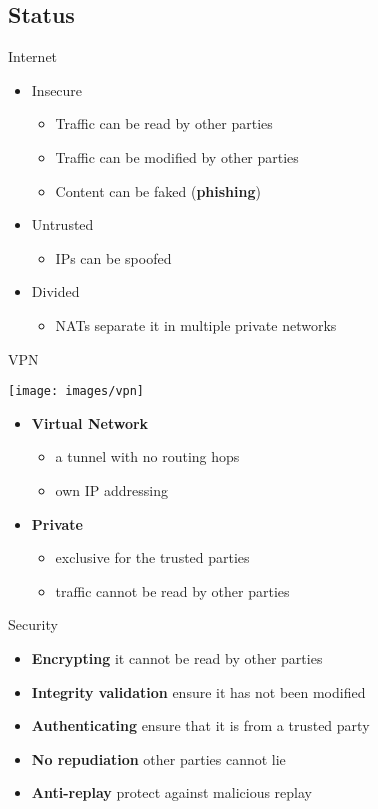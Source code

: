 \documentclass{beamer}
\begin{document}
\subsection*{Status}
\begin{frame}{Internet}
	\begin{itemize}
	\item Insecure
		\begin{itemize}
		\item Traffic can be read by other parties
		\item Traffic can be modified by other parties
		\item Content can be faked (\textbf{phishing})
		\end{itemize}
	\item Untrusted
		\begin{itemize}
		\item IPs can be spoofed
		\end{itemize}
	\item Divided
		\begin{itemize}
		\item NATs separate it in multiple private networks
		\end{itemize}
	\end{itemize}
\end{frame}
\begin{frame}{VPN}
	\begin{center}
	\texttt{[image: images/vpn]}
	\end{center}
	\begin{itemize}
	\item \textbf{Virtual Network}
		\begin{itemize}
		\item a tunnel with no routing hops
		\item own IP addressing
		\end{itemize}
	\item \textbf{Private}
		\begin{itemize}
		\item exclusive for the trusted parties
		\item traffic cannot be read by other parties
		\end{itemize}
	\end{itemize}
\end{frame}
\begin{frame}{Security}
	\begin{itemize}
	\item \textbf{Encrypting} it cannot be read by other parties
	\item \textbf{Integrity validation} ensure it has not been modified
	\item \textbf{Authenticating} ensure that it is from a trusted party
	\item \textbf{No repudiation} other parties cannot lie
	\item \textbf{Anti-replay} protect against malicious replay
	\end{itemize}
\end{frame}
\end{document}
